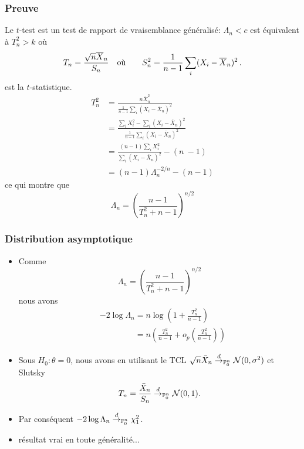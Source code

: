 \begin{frame}
\frametitle{Preuve}
Le $t$-test est un test de rapport de vraisemblance généralisé: $\Lambda_{n}<c$ est équivalent à $T_{n}^{2}>k$ où
$$
T_{n}=\frac{\sqrt{n}\overline{X}_{n}}{S_n}  \quad \text{où} \quad \quad S_n^2= \frac{1}{n-1}\sum_{i}(X_{i}-\overline{X}_{n})^{2} \,.
$$
est la $t$-statistique.
\begin{align*}
T_{n}^{2} &=\frac{n\overline{X}_{n}^{2}}{\frac{1}{n-1}\sum_{i}(X_{i}-\overline{X}_{n})^{2}} \\
&=\frac{\sum_{i}X_{i}^{2}-\sum_{i}(X_{i}-\overline{X}_{n})^{2}}{\frac{1}{n-1}\sum_{i}(X_{i}-\overline{X}_{n})^{2}} \\
&=\frac{(n-1)\sum_{i}X_{i}^{2}}{\sum_{i}(X_{i}-\overline{X}_{n})^{2}}-(n\ -1) \\
&=(n-1)\Lambda_{n}^{-2/n}-(n-1)
\end{align*}
ce qui montre que
$$
\Lambda_{n}=\left(\frac{n-1}{T_{n}^{2}+n-1}\right)^{n/2}
$$
\end{frame}

\begin{frame}
\frametitle{Distribution asymptotique}
\begin{itemize}
\item Comme
$$
\Lambda_{n}=(\frac{n-1}{T_{n}^{2}+n-1})^{n/2}
$$
nous avons
\begin{align*}
&-2\log\Lambda_{n}=n\log\left(1+\frac{T_n^{2}}{n-1}\right) \\
&\phantom{-2\log\Lambda_{n}}=n \left(\frac{T_n^{2}}{n-1}+o_{p}(\frac{T_n^{2}}{n-1}) \right)
\end{align*}
\item Sous $H_{0}: \theta= 0$,  nous avons en utilisant le TCL $\sqrt{n} \bar{X}_n \stackrel{d}{\rightarrow}_{\operatorname{{\mathbb P}}_0^n} \mathcal{N}(0,\sigma^2)$ et Slutsky
$$
T_{n} = \frac{\bar{X}_n}{S_n} \stackrel{d}{\rightarrow}_{\operatorname{{\mathbb P}}_0^n} \mathcal{N}(0,1).
$$
\item Par conséquent $-2 \log \Lambda_n \stackrel{d}{\rightarrow}_{\operatorname{{\mathbb P}}_0^n} \chi_{1}^{2}$.
\item \alert{résultat vrai en toute généralité...}
\end{itemize}
\end{frame}

